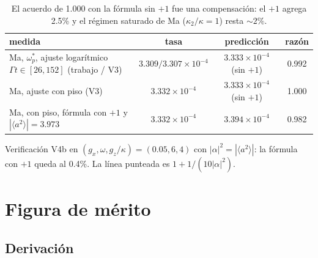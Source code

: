 \documentclass[11pt]{report}
\begin{document}
\begin{table}[h]
\centering
\begin{tabular}{lccc}
\toprule
medida & tasa & predicci\'on & raz\'on\\
\midrule
Ma, $\omega_{p}^{*}$, ajuste logar\'itmico $\Gamma t\in[26,152]$ (trabajo / V3) & $3.309/3.307\times10^{-4}$ & $3.333\times10^{-4}$ (sin $+1$) & 0.992\\
Ma, ajuste con piso (V3) & $3.332\times10^{-4}$ & $3.333\times10^{-4}$ (sin $+1$) & 1.000\\
Ma, con piso, f\'ormula con $+1$ y $|\langle a^{2}\rangle|=3.973$ & $3.332\times10^{-4}$ & $3.394\times10^{-4}$ & 0.982\\
\bottomrule
\end{tabular}
\caption{El acuerdo de 1.000 con la f\'ormula sin $+1$ fue una compensaci\'on: el $+1$ agrega 2.5\% y el r\'egimen saturado de Ma ($\kappa_{2}/\kappa=1$) resta $\sim2\%$.}
\end{table}

\begin{center}
\end{center}
Verificaci\'on V4b en $(g_{x},\omega,g_{z}/\kappa)=(0.05,6,4)$ con $|\alpha|^{2}=|\langle a^{2}\rangle|$: la f\'ormula con $+1$ queda al 0.4\%. La l\'inea punteada es $1+1/(10|\alpha|^{2})$.

\section{Figura de m\'erito}

\subsection{Derivaci\'on}
\end{document}
